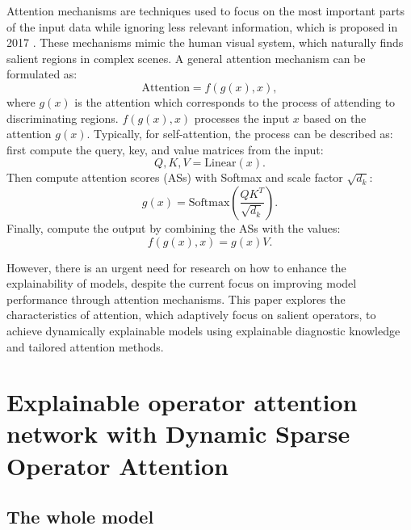 \documentclass[lettersize,journal]{IEEEtran}
\begin{document}
Attention mechanisms are techniques used to focus on the most important parts of the input data while ignoring less relevant information, which is proposed in 2017 \cite{guo_attention_2022}. These mechanisms mimic the human visual system, which naturally finds salient regions in complex scenes.  A general attention mechanism can be formulated as: 
\begin{equation}
    \text{Attention} = f(g(x), x) ,
\end{equation}
where  $g(x)$ is the attention which corresponds to the process of attending to discriminating regions. $ f(g(x), x)$  processes the input \( x \) based on the attention \( g(x) \). Typically, for self-attention, the process can be described as: first compute the query, key, and value matrices from the input:
\begin{equation}
Q, K, V = \text{Linear}(x).
\end{equation}
Then compute attention scores (ASs) with Softmax and scale factor $\sqrt{d_k}$:
   \begin{equation}
    g(x) = \mathrm{Softmax}(\frac{QK^T}{\sqrt{d_k}}).
   \end{equation}
Finally, compute the output by combining the ASs with the values:
\begin{equation}\label{attention}
f(g(x), x) = g(x)V.
\end{equation}

However, there is an urgent need for research on how to enhance the explainability of models, despite the current focus on improving model performance through attention mechanisms. This paper explores the characteristics of attention, which adaptively focus on salient operators, to achieve dynamically explainable models using explainable diagnostic knowledge and tailored attention methods. 


\section{Explainable operator attention network with Dynamic Sparse Operator Attention}

\subsection{The whole model}
\end{document}
